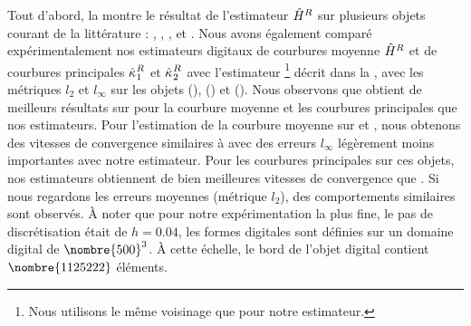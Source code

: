 Tout d'abord, la  montre le résultat de l'estimateur
$\hat{H}^{R}$ sur plusieurs objets courant de la littérature : \Bunny,
\Armadillo, \Dragon, \Lucy et \AsianDragon. Nous avons également comparé
expérimentalement nos estimateurs digitaux de courbures moyenne $\hat{H}^{R}$
et de courbures principales $\hat{\kappa_{}}_{1}^{R}$ et $\hat{\kappa_{}}_{2}^{R}$ avec
l'estimateur \JetFitting \cite{Cazals2005}\footnote{Nous utilisons le même
voisinage que pour notre estimateur.} décrit dans la
, avec les métriques $l_2$ et $l_\infty$ sur les
objets \Sphere (), \RoundedCube
() et \Goursat
(). Nous observons que \JetFitting
obtient de meilleurs résultats sur \Sphere pour la courbure moyenne et les
courbures principales que nos estimateurs. Pour l'estimation de la courbure
moyenne sur \RoundedCube et \Goursat, nous obtenons des vitesses de convergence
similaires à \JetFitting avec des erreurs $l_\infty$ légèrement moins
importantes avec notre estimateur. Pour les courbures principales sur ces
objets, nos estimateurs obtiennent de bien meilleures vitesses de convergence
que \JetFitting. Si nous regardons les erreurs moyennes (métrique
$l_2$), des comportements similaires sont observés. À noter que pour notre
expérimentation la plus fine, le pas de discrétisation était de $h = 0.04$, les
formes digitales sont définies sur un domaine digital de $\nombre{500}^3$. À
cette échelle, le bord de l'objet digital \RoundedCube contient
$\nombre{1125222}$ éléments.


